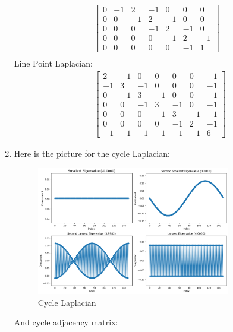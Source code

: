 \documentclass[12pt]{article}
\begin{document}
\begin{enumerate}[leftmargin=\labelsep, label=(\alph*)]
\begin{align*}
\begin{bmatrix}
            0 & -1 & 2 & -1 & 0 & 0 & 0 \\
            0 & 0 & -1 & 2 & -1 & 0 & 0 \\
            0 & 0 & 0 & -1 & 2 & -1 & 0 \\
            0 & 0 & 0 & 0 & -1 & 2 & -1 \\
            0 & 0 & 0 & 0 & 0 & -1 & 1
            \end{bmatrix} \\[1em]
        \end{align*}
        Line Point Laplacian:
        \begin{align*}
            &\begin{bmatrix}
            2 & -1 & 0 & 0 & 0 & 0 & -1 \\
            -1 & 3 & -1 & 0 & 0 & 0 & -1 \\
            0 & -1 & 3 & -1 & 0 & 0 & -1 \\
            0 & 0 & -1 & 3 & -1 & 0 & -1 \\
            0 & 0 & 0 & -1 & 3 & -1 & -1 \\
            0 & 0 & 0 & 0 & -1 & 2 & -1 \\
            -1 & -1 & -1 & -1 & -1 & -1 & 6
            \end{bmatrix}
        \end{align*}        
        \item Here is the picture for the cycle Laplacian:
        \begin{figure}[H]
            \centering
            \includegraphics[width=0.8\textwidth]{cycle_L.png}
            \caption{Cycle Laplacian}
        \end{figure}
        And cycle adjacency matrix:
        \begin{figure}[H]
            \centering

\end{figure}
\end{enumerate}
\end{document}
